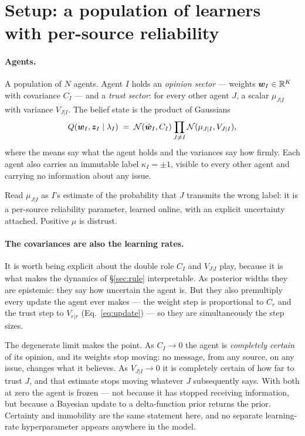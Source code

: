 \section{Setup: a population of learners with per-source reliability}
\label{sec:setup}

\paragraph{Agents.} A population of $N$ agents. Agent $I$ holds an \emph{opinion
sector} --- weights $\bm{w}_I \in \mathbb{R}^K$ with covariance $C_I$ --- and a
\emph{trust sector}: for every other agent $J$, a scalar $\mu_{J|I}$ with variance
$V_{J|I}$. The belief state is the product of Gaussians
\begin{equation}
  Q(\bm{w}_I, \bm{z}_I \mid \lambda_I)
  \;=\; \mathcal{N}(\hat{\bm{w}}_I, C_I)\prod_{J \neq I} \mathcal{N}(\mu_{J|I}, V_{J|I}),
  \label{eq:state}
\end{equation}
where the means say what the agent holds and the variances say how firmly. Each
agent also carries an immutable label $\kappa_I = \pm 1$, visible to every other
agent and carrying no information about any issue.

Read $\mu_{J|I}$ as $I$'s estimate of the probability that $J$ transmits the wrong
label: it is a per-source reliability parameter, learned online, with an explicit
uncertainty attached. Positive $\mu$ is distrust.

\paragraph{The covariances are also the learning rates.} It is worth being
explicit about the double role $C_I$ and $V_{J|I}$ play, because it is what makes
the dynamics of \S\ref{sec:rule} interpretable. As posterior widths they are
epistemic: they say how uncertain the agent is. But they also premultiply every
update the agent ever makes --- the weight step is proportional to $C_r$ and the
trust step to $V_{e|r}$ (Eq.~\ref{eq:update}) --- so they are simultaneously the
step sizes.

The degenerate limit makes the point. As $C_I \to 0$ the agent is
\emph{completely certain} of its opinion, and its weights stop moving: no message,
from any source, on any issue, changes what it believes. As $V_{J|I} \to 0$ it is
completely certain of how far to trust $J$, and that estimate stops moving
whatever $J$ subsequently says. With both at zero the agent is frozen --- not
because it has stopped receiving information, but because a Bayesian update to a
delta-function prior returns the prior. Certainty and immobility are the same
statement here, and no separate learning-rate hyperparameter appears anywhere in
the model.

